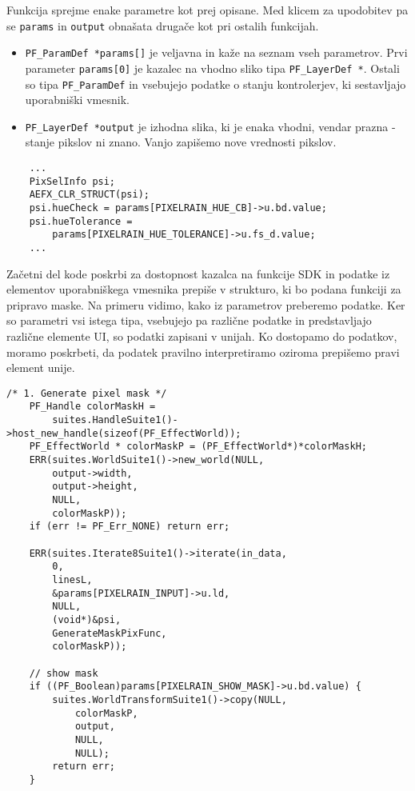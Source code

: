 \documentclass[a4paper, 12pt]{book}
\begin{document}
Funkcija sprejme enake parametre kot prej opisane.
Med klicem za upodobitev pa se \texttt{params} in \texttt{output} obnašata drugače kot pri ostalih funkcijah.
\begin{itemize}
\item{\texttt{PF\_ParamDef *params[]} je veljavna in kaže na seznam vseh parametrov. 
	Prvi parameter \texttt{params[0]} je kazalec na vhodno sliko tipa \texttt{PF\_LayerDef *}.
	Ostali so tipa \texttt{PF\_ParamDef} in vsebujejo podatke o stanju kontrolerjev, ki sestavljajo uporabniški vmesnik.}
\item{\texttt{PF\_LayerDef *output} je izhodna slika, ki je enaka vhodni, vendar prazna - stanje pikslov ni znano. 
	Vanjo zapišemo nove vrednosti pikslov.  }
\end{itemize}

\begin{verbatim}
    ...
    PixSelInfo psi;
    AEFX_CLR_STRUCT(psi);
    psi.hueCheck = params[PIXELRAIN_HUE_CB]->u.bd.value;
    psi.hueTolerance = 
        params[PIXELRAIN_HUE_TOLERANCE]->u.fs_d.value;
    ...
\end{verbatim}

Začetni del kode poskrbi za dostopnost kazalca na funkcije SDK in podatke iz elementov uporabniškega vmesnika prepiše v strukturo, 
ki bo podana funkciji za pripravo maske.
Na primeru vidimo, kako iz parametrov preberemo podatke.
Ker so parametri vsi istega tipa, vsebujejo pa različne podatke in predstavljajo različne elemente UI, so podatki zapisani v unijah.
Ko dostopamo do podatkov, moramo poskrbeti, da podatek pravilno interpretiramo oziroma prepišemo pravi element unije.

\begin{verbatim}
/* 1. Generate pixel mask */
    PF_Handle colorMaskH = 
        suites.HandleSuite1()->host_new_handle(sizeof(PF_EffectWorld));
    PF_EffectWorld * colorMaskP = (PF_EffectWorld*)*colorMaskH;
    ERR(suites.WorldSuite1()->new_world(NULL,
        output->width,
        output->height,
        NULL,
        colorMaskP));
    if (err != PF_Err_NONE) return err;
    
    ERR(suites.Iterate8Suite1()->iterate(in_data,
        0,                        
        linesL,                   
        &params[PIXELRAIN_INPUT]->u.ld, 
        NULL,                        
        (void*)&psi,        
        GenerateMaskPixFunc,  
        colorMaskP));
    
    // show mask
    if ((PF_Boolean)params[PIXELRAIN_SHOW_MASK]->u.bd.value) {
        suites.WorldTransformSuite1()->copy(NULL,
            colorMaskP,
            output,
            NULL,
            NULL);
        return err;
    }
\end{verbatim}
\end{document}
